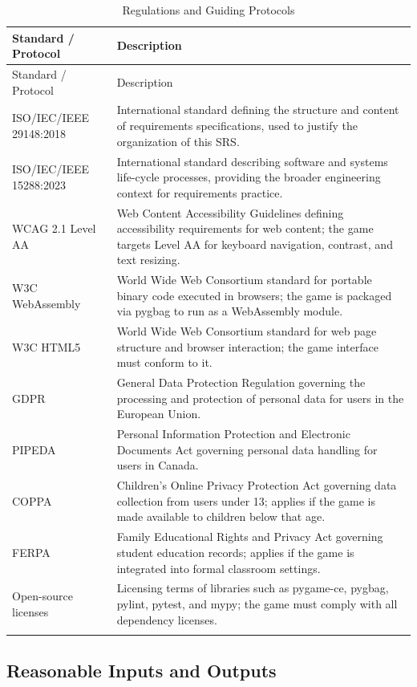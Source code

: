 \documentclass[12pt]{article}
\begin{document}
\begin{longtable}{p{} p{}}
\toprule
Standard / Protocol & Description\\
\midrule
\endfirsthead
\toprule
Standard / Protocol & Description\\
\midrule
\endhead
\endlastfoot
ISO/IEC/IEEE 29148:2018 & International standard defining the structure and content of requirements specifications, used to justify the organization of this SRS. \\
ISO/IEC/IEEE 15288:2023 & International standard describing software and systems life-cycle processes, providing the broader engineering context for requirements practice. \\
WCAG 2.1 Level AA & Web Content Accessibility Guidelines defining accessibility requirements for web content; the game targets Level AA for keyboard navigation, contrast, and text resizing. \\
W3C WebAssembly & World Wide Web Consortium standard for portable binary code executed in browsers; the game is packaged via pygbag to run as a WebAssembly module. \\
W3C HTML5 & World Wide Web Consortium standard for web page structure and browser interaction; the game interface must conform to it. \\
GDPR & General Data Protection Regulation governing the processing and protection of personal data for users in the European Union. \\
PIPEDA & Personal Information Protection and Electronic Documents Act governing personal data handling for users in Canada. \\
COPPA & Children's Online Privacy Protection Act governing data collection from users under 13; applies if the game is made available to children below that age. \\
FERPA & Family Educational Rights and Privacy Act governing student education records; applies if the game is integrated into formal classroom settings. \\
Open-source licenses & Licensing terms of libraries such as pygame-ce, pygbag, pylint, pytest, and mypy; the game must comply with all dependency licenses. \\
\bottomrule
\caption{Regulations and Guiding Protocols} \label{tab:RegulationsAndProtocols}
\end{longtable}

\subsection{Reasonable Inputs and Outputs}
\end{document}
